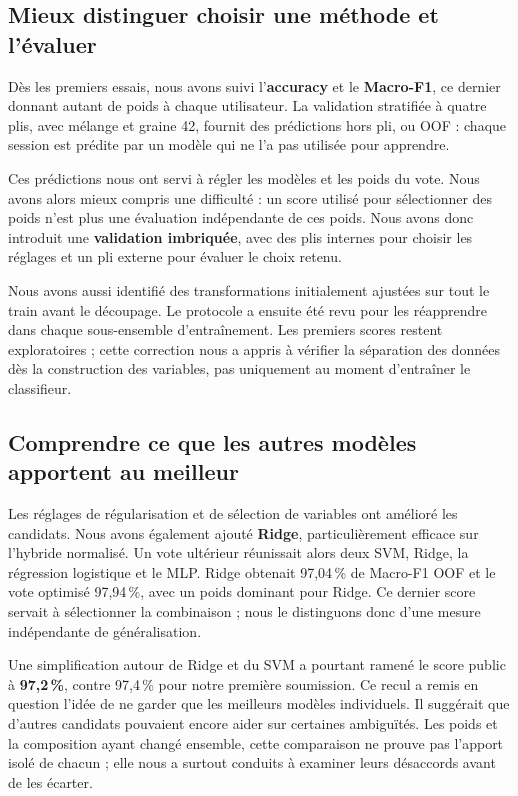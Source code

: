 \documentclass{rapportECL}
\begin{document}
\subsection{Mieux distinguer choisir une méthode et l'évaluer}

Dès les premiers essais, nous avons suivi l'\textbf{accuracy} et le \textbf{Macro-F1}, ce dernier donnant autant de poids à chaque utilisateur. La validation stratifiée à quatre plis, avec mélange et graine 42, fournit des prédictions hors pli, ou OOF : chaque session est prédite par un modèle qui ne l'a pas utilisée pour apprendre.

Ces prédictions nous ont servi à régler les modèles et les poids du vote. Nous avons alors mieux compris une difficulté : un score utilisé pour sélectionner des poids n'est plus une évaluation indépendante de ces poids. Nous avons donc introduit une \textbf{validation imbriquée}, avec des plis internes pour choisir les réglages et un pli externe pour évaluer le choix retenu.

Nous avons aussi identifié des transformations initialement ajustées sur tout le train avant le découpage. Le protocole a ensuite été revu pour les réapprendre dans chaque sous-ensemble d'entraînement. Les premiers scores restent exploratoires ; cette correction nous a appris à vérifier la séparation des données dès la construction des variables, pas uniquement au moment d'entraîner le classifieur.

\subsection{Comprendre ce que les autres modèles apportent au meilleur}

Les réglages de régularisation et de sélection de variables ont amélioré les candidats. Nous avons également ajouté \textbf{Ridge}, particulièrement efficace sur l'hybride normalisé. Un vote ultérieur réunissait alors deux SVM, Ridge, la régression logistique et le MLP. Ridge obtenait 97,04\,\% de Macro-F1 OOF et le vote optimisé 97,94\,\%, avec un poids dominant pour Ridge. Ce dernier score servait à sélectionner la combinaison ; nous le distinguons donc d'une mesure indépendante de généralisation.

Une simplification autour de Ridge et du SVM a pourtant ramené le score public à \textbf{97,2\,\%}, contre 97,4\,\% pour notre première soumission. Ce recul a remis en question l'idée de ne garder que les meilleurs modèles individuels. Il suggérait que d'autres candidats pouvaient encore aider sur certaines ambiguïtés. Les poids et la composition ayant changé ensemble, cette comparaison ne prouve pas l'apport isolé de chacun ; elle nous a surtout conduits à examiner leurs désaccords avant de les écarter.
\end{document}
